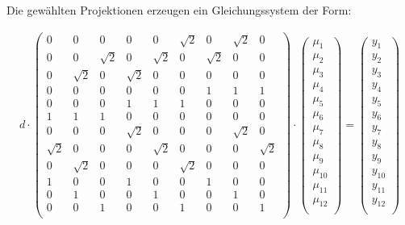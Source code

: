 Die gewählten Projektionen erzeugen ein Gleichungssystem der Form:

\begin{align}
    d \cdot
    \begin{pmatrix}
      0 & 0 & 0 & 0 & 0 & \sqrt{2} & 0 & \sqrt{2} & 0 \\
      0 & 0 & \sqrt{2} & 0 & \sqrt{2} & 0 & \sqrt{2} & 0 & 0 \\
      0 & \sqrt{2} & 0 & \sqrt{2} & 0 & 0 & 0 & 0 & 0 \\
      0 & 0 & 0 & 0 & 0 & 0 & 1 & 1 & 1 \\
      0 & 0 & 0 & 1 & 1 & 1 & 0 & 0 & 0 \\
      1 & 1 & 1 & 0 & 0 & 0 & 0 & 0 & 0 \\
      0 & 0 & 0 & \sqrt{2} & 0 & 0 & 0  & \sqrt{2} & 0 \\
      \sqrt{2} & 0 & 0 & 0 & \sqrt{2} & 0 & 0 & 0 & \sqrt{2} \\
      0 & \sqrt{2} & 0 & 0 & 0  & \sqrt{2} & 0 & 0 & 0\\
      1 & 0 & 0 & 1 & 0 & 0 & 1 & 0 & 0 \\
      0 & 1 & 0 & 0 & 1 & 0 & 0 & 1 & 0 \\
      0 & 0 & 1 & 0 & 0 & 1 & 0 & 0 & 1 \\
    \end{pmatrix}
    \cdot
    \begin{pmatrix}
      \mu_1 \\
      \mu_2 \\
      \mu_3 \\
      \mu_4 \\
      \mu_5 \\
      \mu_6 \\
      \mu_7 \\
      \mu_8 \\
      \mu_9 \\
      \mu_{10} \\
      \mu_{11} \\
      \mu_{12} \\
    \end{pmatrix}
    =
    \begin{pmatrix}
      y_1 \\
      y_2 \\
      y_3 \\
      y_4 \\
      y_5 \\
      y_6 \\
      y_7 \\
      y_8 \\
      y_9 \\
      y_{10} \\
      y_{11} \\
      y_{12} \\
    \end{pmatrix}
    \label{eqn:LGS_ausgeschrieben}
\end{align}

